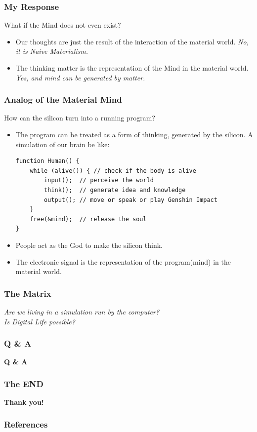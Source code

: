 \documentclass{beamer}
\begin{document}
\begin{frame}
    \frametitle{My Response}
    What if the Mind does not even exist?
    \begin{itemize}
        \item<2-> Our thoughts are just the result of the interaction of the material world. \emph{No, it is Naive Materialism.}
        \item<3-> The thinking matter is the representation of the Mind in the material world. \emph{Yes, and mind can be generated by matter.}
    \end{itemize}
\end{frame}

\begin{frame}[fragile]
    \frametitle{Analog of the Material Mind}
    How can the silicon turn into a running program?
    \begin{itemize}
        \item The program can be treated as a form of thinking, generated by the silicon. A simulation of our brain be like:
            \begin{lstlisting}
function Human() {
    while (alive()) { // check if the body is alive
        input();  // perceive the world
        think();  // generate idea and knowledge
        output(); // move or speak or play Genshin Impact
    }
    free(&mind);  // release the soul
}
            \end{lstlisting}
        \item<2-> People act as the God to make the silicon think.
        \item<3-> The electronic signal is the representation of the program(mind) in the material world.
    \end{itemize}
\end{frame}

\begin{frame}
    \frametitle{The Matrix}
    \centering
    {\large \emph{ Are we living in a simulation run by the computer? \\ Is Digital Life possible?}}
\end{frame}

\begin{frame}
    \frametitle{Q \& A}
    {\Huge \textbf{Q \& A}}
\end{frame}

\begin{frame}
    \frametitle{The END}
    \centering
    {\Huge \textbf{Thank you!}}
\end{frame}

\begin{frame}
    \frametitle{References}
    \printbibliography
\end{frame}
\end{document}
